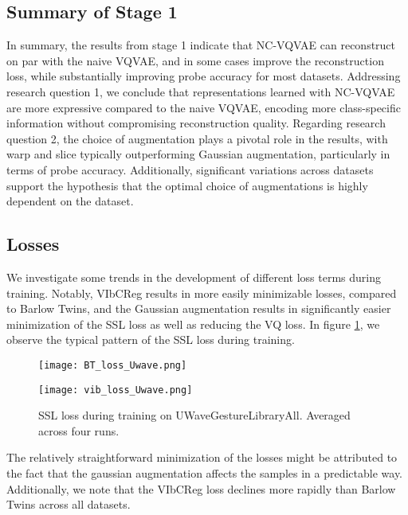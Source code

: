 \documentclass[../../thesis.tex]{subfiles}
\begin{document}
\subsection*{Summary of Stage 1}

In summary, the results from stage 1 indicate that NC-VQVAE can reconstruct on par with the naive VQVAE, and in some cases improve the reconstruction loss, while substantially improving probe accuracy for most datasets. Addressing research question 1, we conclude that representations learned with NC-VQVAE are more expressive compared to the naive VQVAE, encoding more class-specific information without compromising reconstruction quality. Regarding research question 2, the choice of augmentation plays a pivotal role in the results, with warp and slice typically outperforming Gaussian augmentation, particularly in terms of probe accuracy. Additionally, significant variations across datasets support the hypothesis that the optimal choice of augmentations is highly dependent on the dataset.

\subsection{Losses}

We investigate some trends in the development of different loss terms during training. Notably, VIbCReg results in more easily minimizable losses, compared to Barlow Twins, and the Gaussian augmentation results in significantly easier minimization of the SSL loss as well as reducing the VQ loss. In figure \ref{fig:SSL_loss_UWave}, we observe the typical pattern of the SSL loss during training.

\begin{figure}[h]
    \centering
    \begin{minipage}[b]{0.49\textwidth}
        \centering
        \texttt{[image: BT\_loss\_Uwave.png]}
    \end{minipage}
    \hfill
    \begin{minipage}[b]{0.49\textwidth}
        \centering
        \texttt{[image: vib\_loss\_Uwave.png]}
    \end{minipage}
    \caption{SSL loss during training on UWaveGestureLibraryAll. Averaged across four runs.}
    \label{fig:SSL_loss_UWave}
\end{figure}

The relatively straightforward minimization of the losses might be attributed to the fact that the gaussian augmentation affects the samples in a predictable way. Additionally, we note that the VIbCReg loss declines more rapidly than Barlow Twins across all datasets. \newline
\end{document}
